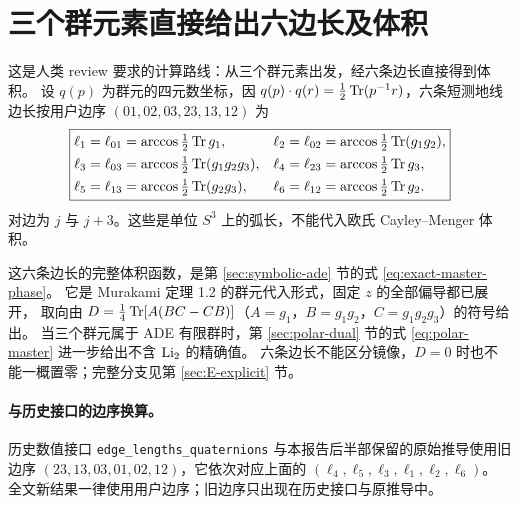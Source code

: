 \section{三个群元素直接给出六边长及体积}

这是人类 review 要求的计算路线：从三个群元素出发，经六条边长直接得到体积。
设 $q(p)$ 为群元的四元数坐标，因
$q(p)\cdot q(r)=\tfrac12\operatorname{Tr}(p^{-1}r)$，六条短测地线边长按用户边序 $(01,02,03,23,13,12)$ 为
\begin{equation}
\boxed{\begin{aligned}
\ell_1=\ell_{01}&=\arccos\tfrac12\operatorname{Tr} g_1,&
\ell_2=\ell_{02}&=\arccos\tfrac12\operatorname{Tr}(g_1g_2),\\
\ell_3=\ell_{03}&=\arccos\tfrac12\operatorname{Tr}(g_1g_2g_3),&
\ell_4=\ell_{23}&=\arccos\tfrac12\operatorname{Tr} g_3,\\
\ell_5=\ell_{13}&=\arccos\tfrac12\operatorname{Tr}(g_2g_3),&
\ell_6=\ell_{12}&=\arccos\tfrac12\operatorname{Tr} g_2 .
\end{aligned}}\label{eq:group-six-lengths}
\end{equation}
对边为 $j$ 与 $j+3$。这些是单位 $S^3$ 上的弧长，不能代入欧氏 Cayley--Menger 体积。

这六条边长的完整体积函数，是第 \ref{sec:symbolic-ade} 节的式 \eqref{eq:exact-master-phase}。
它是 Murakami 定理 1.2\cite{murakami} 的群元代入形式，固定 $z$ 的全部偏导都已展开，
取向由 $D=\tfrac14\operatorname{Tr}[A(BC-CB)]$（$A=g_1$，$B=g_1g_2$，$C=g_1g_2g_3$）的符号给出。
当三个群元属于 ADE 有限群时，第 \ref{sec:polar-dual} 节的式 \eqref{eq:polar-master}
进一步给出不含 $\operatorname{Li}_2$ 的精确值。
六条边长不能区分镜像，$D=0$ 时也不能一概置零；完整分支见第 \ref{sec:E-explicit} 节。

\paragraph{与历史接口的边序换算。}
历史数值接口 \texttt{edge\_lengths\_quaternions} 与本报告后半部保留的原始推导使用旧边序
$(23,13,03,01,02,12)$，它依次对应上面的 $(\ell_4,\ell_5,\ell_3,\ell_1,\ell_2,\ell_6)$。
全文新结果一律使用用户边序；旧边序只出现在历史接口与原推导中。
